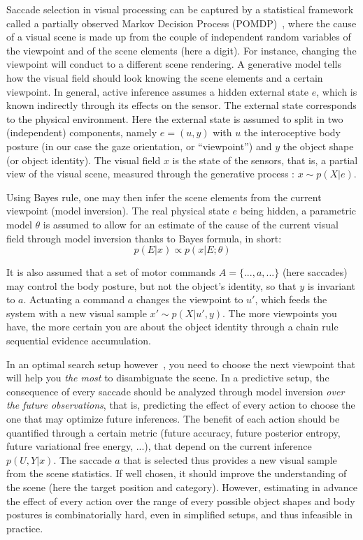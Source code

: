 Saccade selection in visual processing can be captured by a statistical framework called a
partially observed Markov Decision Process (POMDP)~\cite{Najemnik05,Butko2010infomax,Friston12}, where the cause of a visual scene is  made up from the couple of independent random variables of the viewpoint and of the scene elements (here a digit). For instance, changing the viewpoint will conduct to a different scene rendering.
A generative model tells how the visual field should look knowing the scene elements and a certain viewpoint.
In general, active inference assumes a hidden external state $e$, which is known indirectly through its effects on the sensor. The external state corresponds to the physical environment. Here the external state is assumed to split in two (independent) components, namely $e = (u,y)$ with $u$ the interoceptive body posture (in our case the gaze orientation, or ``viewpoint'') and $y$ the object shape (or object identity). The visual field $x$ is the state of the sensors, that is, a partial view of the visual scene, measured through the generative process : $x\sim p(X|e)$.


Using Bayes rule, one may then infer the scene elements from the current viewpoint (model inversion).
 The real physical state $e$ being hidden, a parametric model $\theta$ is assumed to allow for an estimate of the cause of the current visual field through model inversion thanks to Bayes formula, in short:
$$p(E|x) \propto p(x|E;\theta)$$


It is also assumed that a set of motor commands $A = \{..., a, ...\}$ (here saccades) may control the body posture, but not the object's identity, so that $y$ is invariant to $a$. Actuating a command $a$ changes the viewpoint to $u'$, which feeds the system with a new visual sample $x'\sim p(X|u', y)$. The more viewpoints you have, the more certain you are about the object identity through a chain rule sequential evidence accumulation.

In an optimal search setup however~\cite{Najemnik05}, you need to choose the next viewpoint that will help you \emph{the most} to disambiguate the scene.
In a predictive setup, the consequence of every saccade should be analyzed through model inversion \emph{over the future observations}, that is, predicting the effect of every action to choose the one that may optimize future inferences. The benefit of each action should be quantified through a certain metric (future accuracy, future posterior entropy, future variational free energy, ...), that depend on the current inference $p(U,Y|x)$. The saccade $a$ that is selected thus provides a new visual sample from the scene statistics. If well chosen, it should improve the understanding of the scene (here the target position and category). However, estimating in advance the effect of every action over the range of every possible object shapes and body postures is combinatorially hard, even in simplified setups, and thus infeasible in practice.

